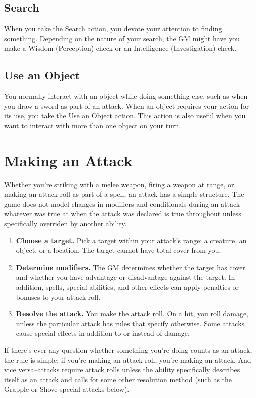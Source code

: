 \subsection{Search}

When you take the Search action, you devote your attention to finding something. Depending on the nature of your search, the GM might have you make a Wisdom (Perception) check or an Intelligence (Investigation) check.

\subsection{Use an Object}

You normally interact with an object while doing something else, such as when you draw a sword as part of an attack. When an object requires your action for its use, you take the Use an Object action. This action is also useful when you want to interact with more than one object on your turn.

\section{Making an Attack}

Whether you're striking with a melee weapon, firing a weapon at range, or making an attack roll as part of a spell, an attack has a simple structure. The game does not model changes in modifiers and conditionals during an attack--whatever was true at when the attack was declared is true throughout unless specifically overriden by another ability.

\begin{enumerate}
\item \textbf{Choose a target.} Pick a target within your attack's range: a creature, an object, or a location. The target cannot have total cover from you.
\item \textbf{Determine modifiers.} The GM determines whether the target has cover and whether you have advantage or disadvantage against the target. In addition, spells, special abilities, and other effects can apply penalties or bonuses to your attack roll.
\item \textbf{Resolve the attack.} You make the attack roll. On a hit, you roll damage, unless the particular attack has rules that specify otherwise. Some attacks cause special effects in addition to or instead of damage.
\end{enumerate}

If there's ever any question whether something you're doing counts as an attack, the rule is simple: if you're making an attack roll, you're making an attack. And vice versa--attacks require attack rolls unless the ability specifically describes itself as an attack and calls for some other resolution method (such as the Grapple or Shove special attacks below).

